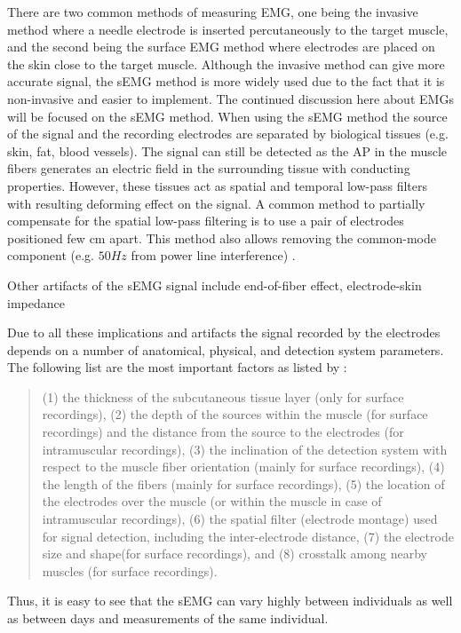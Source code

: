 There are two common methods of measuring \ac{EMG}, one being the invasive method where a needle electrode is inserted percutaneously to the target muscle, and the second being the surface \ac{EMG} method where electrodes are placed on the skin close to the target muscle. 
Although the invasive method can give more accurate signal, the \ac{sEMG} method is more widely used due to the fact that it is non-invasive and easier to implement. 
The continued discussion here about \ac{EMG}s will be focused on the \ac{sEMG} method.
When using the \ac{sEMG} method the source of the signal and the recording electrodes are separated by biological tissues (e.g. skin, fat, blood vessels).
The signal can still be detected as the \ac{AP} in the muscle fibers generates an electric field in the surrounding tissue with conducting properties.
However, these tissues act as spatial and temporal low-pass filters with resulting deforming effect on the signal.
A common method to partially compensate for the spatial low-pass filtering is to use a pair of electrodes positioned few cm apart.
This method also allows removing the common-mode component (e.g. $50Hz$ from power line interference) \cite{Farina2016}.

Other artifacts of the \ac{sEMG} signal include end-of-fiber effect, electrode-skin impedance

Due to all these implications and artifacts the signal recorded by the electrodes depends on a number of anatomical, physical, and detection system parameters. The following list are the most important factors as listed by :
\begin{quote}
(1) the thickness of the subcutaneous tissue layer (only for surface recordings),
(2) the depth of the sources within the muscle (for surface recordings) and the distance from the source to the electrodes (for intramuscular recordings),
(3) the inclination of the detection system with respect to the muscle fiber orientation (mainly for surface recordings),
(4) the length of the fibers (mainly for surface recordings),
(5) the location of the electrodes over the muscle (or within the muscle in case of intramuscular recordings),
(6) the spatial filter (electrode montage) used for signal detection, including the inter-electrode distance,
(7) the electrode size and shape(for surface recordings), and
(8) crosstalk among nearby muscles (for surface recordings).
\end{quote}
Thus, it is easy to see that the \ac{sEMG} can vary highly between individuals as well as between days and measurements of the same individual.

